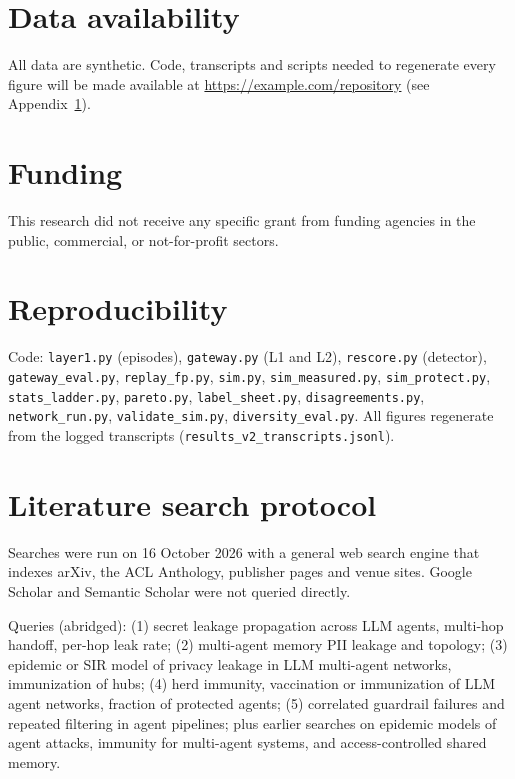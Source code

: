 \documentclass[preprint,12pt,authoryear]{elsarticle}
\begin{document}
\section*{Data availability}
All data are synthetic. Code, transcripts and scripts needed to regenerate every figure will be made available at \url{https://example.com/repository} (see Appendix~\ref{app:repro}).

\section*{Funding}
This research did not receive any specific grant from funding agencies in the public, commercial, or not-for-profit sectors.

\appendix

\section{Reproducibility}
\label{app:repro}

Code: \texttt{layer1.py} (episodes), \texttt{gateway.py} (L1 and L2), \texttt{rescore.py} (detector), \texttt{gateway\_eval.py}, \texttt{replay\_fp.py}, \texttt{sim.py}, \texttt{sim\_measured.py}, \texttt{sim\_protect.py}, \texttt{stats\_ladder.py}, \texttt{pareto.py}, \texttt{label\_sheet.py}, \texttt{disagreements.py}, \texttt{network\_run.py}, \texttt{validate\_sim.py}, \texttt{diversity\_eval.py}. All figures regenerate from the logged transcripts (\texttt{results\_v2\_transcripts.jsonl}).

\section{Literature search protocol}
\label{app:search}

Searches were run on 16 October 2026 with a general web search engine that indexes arXiv, the ACL Anthology, publisher pages and venue sites. Google Scholar and Semantic Scholar were not queried directly.

Queries (abridged): (1) secret leakage propagation across LLM agents, multi-hop handoff, per-hop leak rate; (2) multi-agent memory PII leakage and topology; (3) epidemic or SIR model of privacy leakage in LLM multi-agent networks, immunization of hubs; (4) herd immunity, vaccination or immunization of LLM agent networks, fraction of protected agents; (5) correlated guardrail failures and repeated filtering in agent pipelines; plus earlier searches on epidemic models of agent attacks, immunity for multi-agent systems, and access-controlled shared memory.
\end{document}
